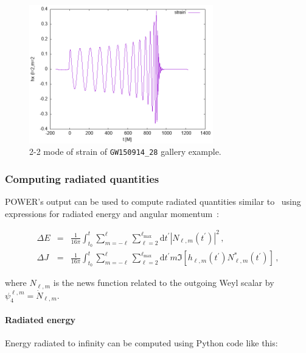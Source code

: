 \begin{figure}[htbp!]
\centering
\includegraphics[width=8cm]{strain_22}
\caption{2-2 mode of strain of \texttt{GW150914\_28} gallery example.}\label{fig:strain22}
\end{figure}

\subsubsection{Computing radiated quantities}\label{sec:radiated-quantities}

POWER's output can be used to compute radiated quantities similar
to~\cite{POWER-pyGWAnalysis:web} using expressions for radiated energy and
angular momentum~\cite{POWER-Damour:2011fu}:

\begin{eqnarray}
\Delta E  &=& \frac{1}{16\pi} \int_{t_{0}}^{t} \sum_{m=-\ell}^{\ell} \sum_{\ell=2}^{\ell_{\max}} \mathrm{d}t^{\prime} \left| N_{\ell,m} \left(t^{\prime}\right) \right|^2\,,
\label{eqn:energy}\\
\Delta J  &=& \frac{1}{16\pi} \int_{t_{0}}^{t} \sum_{m=-\ell}^{\ell} \sum_{\ell=2}^{\ell_{\max}} \mathrm{d}t^{\prime} m \Im \left[h_{\ell,m}\left(t^{\prime}\right) N^{*}_{\ell,m} \left(t^{\prime}\right)\right]\,,
\label{eqn:angmom}
\end{eqnarray}

where $N_{\ell,m}$ is the news function related to the outgoing Weyl scalar by $\psi_4^{\ell,m} = \dot N_{\ell,m}$.

\paragraph{Radiated energy}

Energy radiated to infinity can be computed using Python code like this:

